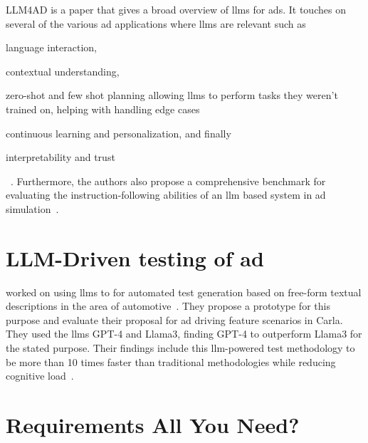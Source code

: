 LLM4AD is a paper that gives a broad overview of \acrshort{llms} for \acrlong{ads}. It touches on
several of the various \acrshort{ad} applications where \acrshort{llms} are relevant such as
\begin{inparaenum}
    \item language interaction,
    \item contextual understanding,
    \item zero-shot and few shot planning allowing \acrshort{llms} to perform tasks they weren't trained
    on, helping with handling edge cases
    \item continuous learning and personalization, and finally
    \item interpretability and trust \end{inparaenum}~\cite[2]{LLM4AD}. Furthermore, the authors
also propose a comprehensive benchmark for evaluating the instruction-following abilities of an
\acrshort{llm} based system in \acrshort{ad} simulation~\cite[1]{LLM4AD}.

\section{LLM-Driven testing of \acrshort{ad}}

\citeauthor{LLMDrivenTestingADS24} worked on using \acrshort{llms} to for automated test generation
based on free-form textual descriptions in the area of automotive~\cite[173]{LLMDrivenTestingADS24}.
They propose a prototype for this purpose and evaluate their proposal for \acrshort{ad} driving
feature scenarios in Carla. They used the \acrshort{llms} GPT-4 and Llama3, finding GPT-4 to
outperform Llama3 for the stated purpose. Their findings include this \acrshort{llm}-powered test
methodology to be more than \num{10} times faster than traditional methodologies while reducing
cognitive load~\cite[173]{LLMDrivenTestingADS24}.

\section{Requirements All You Need?}

